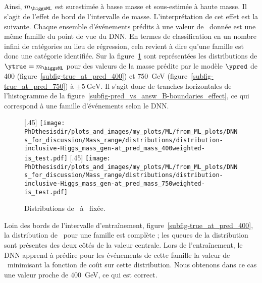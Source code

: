 \par
Ainsi, $m_{\higgsML}$ est surestimée à basse masse
et
sous-estimée à haute masse.
Il s'agit de l'effet de bord de l'intervalle de masse.
L'interprétation de cet effet est la suivante.
Chaque ensemble d'événements prédits à une valeur de \ypred\ donnée est une même famille du point de vue du DNN.
En termes de classification en un nombre infini de catégories au lieu de régression, cela revient à dire qu'une famille est donc une catégorie identifiée.
Sur la figure~\ref{fig-B-boundaries_effect-true_at_pred}
sont représentées les distributions de $\ytrue=m_{\higgsML}$
pour des valeurs de la masse prédite par le modèle $\ypred$ de
\num{400} (figure~\ref{subfig-true_at_pred_400}) et \SI{750}{\GeV} (figure~\ref{subfig-true_at_pred_750})
à $\pm\SI{5}{\GeV}$.
Il s'agit donc de tranches horizontales de l'histogramme de la figure~\ref{subfig-pred_vs_answ_B-boundaries_effect},
ce qui correspond à une famille d'événements selon le DNN.
\begin{figure}[h]
\centering

[.45\textwidth]
{\texttt{[image: \\PhDthesisdir/plots\_and\_images/my\_plots/ML/from\_ML\_plots/DNNs\_for\_discussion/Mass\_range/distributions/distribution-inclusive-Higgs\_mass\_gen-at\_pred\_mass\_400weighted-is\_test.pdf]}\vspace{-.5\baselineskip}}
\hfill
{}[.45\textwidth]
{\texttt{[image: \\PhDthesisdir/plots\_and\_images/my\_plots/ML/from\_ML\_plots/DNNs\_for\_discussion/Mass\_range/distributions/distribution-inclusive-Higgs\_mass\_gen-at\_pred\_mass\_750weighted-is\_test.pdf]}\vspace{-.5\baselineskip}}

\caption{Distributions de \ytrue\ à \ypred\ fixée.}
\label{fig-B-boundaries_effect-true_at_pred}
\end{figure}
\par
Loin des bords de l'intervalle d'entraînement,
figure~\ref{subfig-true_at_pred_400},
la distribution de \ytrue\ pour une famille est complète ;
les queues de la distribution sont présentes
des deux côtés de la valeur centrale.
Lors de l'entraînement,
le DNN \og apprend \fg{} à prédire pour les événements de cette famille
la valeur de \ypred\ minimisant la fonction de coût sur cette distribution.
Nous obtenons dans ce cas une valeur proche de \SI{400}{\GeV}, ce qui est correct.
